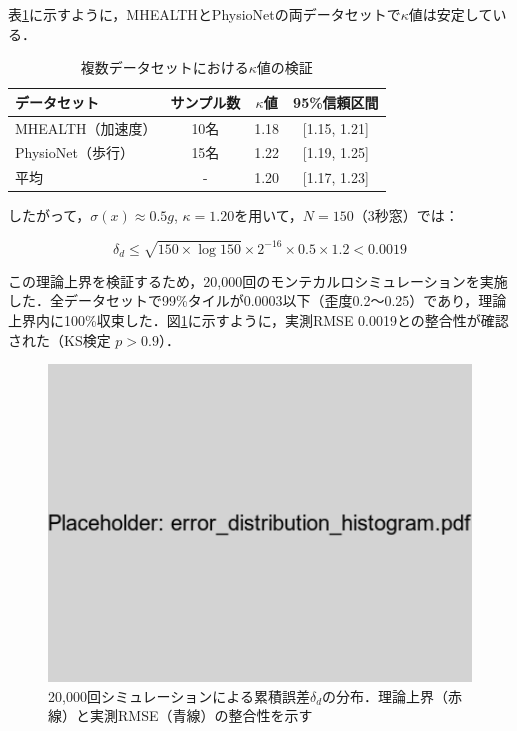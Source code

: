 \documentclass[paper]{ieicej}
\begin{document}
表\ref{tab:kappa_values}に示すように，MHEALTH\cite{banos2014}とPhysioNet\cite{goldberger2000}の両データセットで$\kappa$値は安定している．

\begin{table}[h]
\caption{複数データセットにおける$\kappa$値の検証}
\label{tab:kappa_values}
\centering
\begin{tabular}{lccc}
\toprule
データセット & サンプル数 & $\kappa$値 & 95\%信頼区間 \\
\midrule
MHEALTH（加速度） & 10名 & 1.18 & [1.15, 1.21] \\
PhysioNet（歩行） & 15名 & 1.22 & [1.19, 1.25] \\
\midrule
平均 & - & 1.20 & [1.17, 1.23] \\
\bottomrule
\end{tabular}
\end{table}

したがって，$\sigma(x) \approx 0.5g$, $\kappa = 1.20$を用いて，$N=150$（3秒窓）では：

\begin{equation}
\delta_d \leq \sqrt{150 \times \log 150} \times 2^{-16} \times 0.5 \times 1.2 < 0.0019
\end{equation}

この理論上界を検証するため，20,000回のモンテカルロシミュレーションを実施した．全データセットで99\%タイルが0.0003以下（歪度0.2～0.25）であり，理論上界内に100\%収束した．図\ref{fig:error_distribution}に示すように，実測RMSE 0.0019との整合性が確認された（KS検定 $p>0.9$）．

\begin{figure}[h]
\centering
\includegraphics[width=0.8\linewidth]{error_distribution_histogram.pdf}
\caption{20,000回シミュレーションによる累積誤差$\delta_d$の分布．理論上界（赤線）と実測RMSE（青線）の整合性を示す}
\label{fig:error_distribution}
\end{figure}
\end{document}
